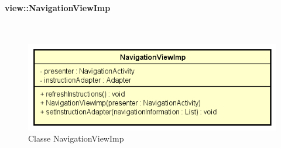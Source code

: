\documentclass[../DefinizioneDiProdotto.tex]{subfiles}
\begin{document}
\paragraph{view::NavigationViewImp}
\
\begin{figure}[H]
	\centering
	\includegraphics[width=\maxwidth]{img/NavigationViewImp.png}
	\caption{Classe NavigationViewImp}\label{fig:view::NavigationViewImp} 
\end{figure}
\end{document}
